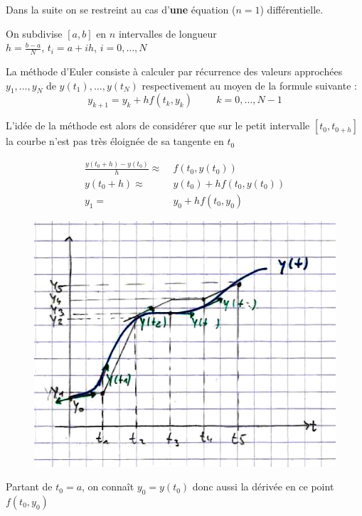 Dans la suite on se restreint au cas d'\textbf{une} équation ($n=1$) différentielle.
\vspace{0.5cm}

\begin{exemple}
    On subdivise $[a,b]$ en $n$ intervalles de longueur \\ $h = \displaystyle\frac{b-a}{N}$, $t_i = a+ih$, $i=0,\dots,N$

    La méthode d'Euler consiste à calculer par récurrence des valeurs approchées
    $y_1, \dots, y_N$ de $y(t_1), \dots, y(t_N)$ respectivement au moyen de la formule suivante :
    \[
        y_{k+1} = y_k + h f(t_k,y_k) \hspace{1cm} k=0,\dots,N-1
    \]

    L'idée de la méthode est alors de considérer que sur le petit intervalle $[t_0,t_{0+h}]$ la
    courbe n'est pas très éloignée de sa tangente en $t_0$

    \[
        \begin{split}
            \frac{y(t_0 + h) - y(t_0)}{h} \approx \; & f(t_0,y(t_0)) \\
            y(t_0 + h) \approx \; & y(t_0) + h f (t_0, y(t_0)) \\
            y_1 = \; & y_0 + h f(t_0,y_0)
        \end{split}
    \]

    \vspace{1cm}

    \begin{figure}[h]
        \centering
        \includegraphics[scale=0.42]{5-EDO-euler.png}
    \end{figure}

    Partant de $t_0 = a$, on connaît $y_0 = y(t_0)$ donc aussi la dérivée en ce point $f(t_0,y_0)$

\end{exemple}

